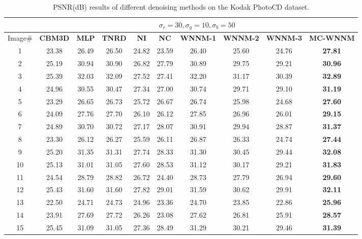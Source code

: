 \documentclass[10pt,onecolumn,letterpaper]{article}
\begin{document}
\begin{table}
\caption{PSNR(dB) results of different denoising methods on the Kodak PhotoCD dataset.}
\label{t2}
\begin{center}
\renewcommand\arraystretch{1.0}
\footnotesize
\begin{tabular}{|c||c|c|c|c|c|c|c|c|c|}
\hline
&\multicolumn{9}{c|}{ $\sigma_{r} = 30, \sigma_{g} = 10, \sigma_{b} = 50$}
\\
\hline
\hline
Image\#
&
\textbf{CBM3D}
&
\textbf{MLP}
&
\textbf{TNRD}
&
\textbf{NI}
&
\textbf{NC}
&
\textbf{WNNM-1}
&
\textbf{WNNM-2}
&
\textbf{WNNM-3}
&
\textbf{MC-WNNM}
\\
\hline
1 & 23.38 & 26.49 & 26.50 & 24.82 & 23.59 & 26.40 & 25.60 & 24.76 & \textbf{27.81}
\\
\hline
2 & 25.19 & 30.94 & 30.90 & 26.82 & 27.79 & 30.89 & 29.75 & 29.21 & \textbf{30.96}
\\
\hline
3 & 25.39 & 32.03 & 32.09 & 27.52 & 27.41 & 32.20 & 31.17 & 30.39 & \textbf{32.89}
\\
\hline 
4 & 24.96 & 30.55 & 30.47 & 27.34 & 27.00 & 30.74 & 29.71 & 29.10 & \textbf{31.19} 
\\
\hline
5 & 23.29 & 26.65 & 26.73 & 25.72 & 26.67 & 26.74 & 25.98 & 24.68 & \textbf{27.60}
\\
\hline
6 & 24.09 & 27.76 & 27.70 & 26.10 & 26.12 & 27.85 & 26.96 & 26.01 & \textbf{29.15}
\\
\hline
7 & 24.89 & 30.70 & 30.72 & 27.17 & 28.07 & 30.91 & 29.94 & 28.87 & \textbf{31.37} 
\\
\hline
8 & 23.30 & 26.12 & 26.27 & 25.59 & 26.11 & 26.87 & 26.33 & 24.74 & \textbf{27.44}
\\
\hline
9 & 25.20 & 31.35 & 31.31 & 27.74 & 28.33 & 31.30 & 30.45 & 29.44 & \textbf{32.08}
\\
\hline
10 & 25.13 & 31.01 & 31.05 & 27.60 & 28.53 & 31.12 & 30.17 & 29.21 & \textbf{31.83}
\\
\hline
11 & 24.54 & 28.79 & 28.82 & 26.72 & 24.40 & 28.73 & 27.79 & 26.94 & \textbf{29.60}
\\
\hline
12 & 25.43 & 31.60 & 31.60 & 27.82 & 29.01 & 31.59 & 30.62 & 29.91 & \textbf{32.11}
\\
\hline
13 & 22.50 & 24.71 & 24.73 & 24.96 & 23.36 & 24.70 & 23.85 & 22.86 & \textbf{25.96}
\\
\hline
14 & 23.91 & 27.69 & 27.72 & 26.26 & 23.08 & 27.62 & 26.81 & 25.91 & \textbf{28.57}
\\
\hline
15 & 25.45 & 31.09 & 31.05 & 27.36 & 28.49 & 31.29 & 30.21 & 29.46 & \textbf{31.39}

\end{tabular}
\end{center}
\end{table}
\end{document}
